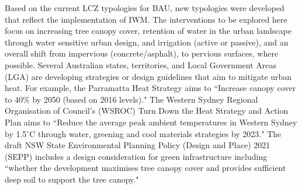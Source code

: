 \documentclass[utf8]{frontiersSCNS} %
\begin{document}

Based on the current LCZ typologies for BAU, new typologies were developed that reflect the implementation of IWM. The interventions to be explored here focus on increasing tree canopy cover, retention of water in the urban landscape through water sensitive urban design, and irrigation (active or passive), and an overall shift from impervious (concrete/asphalt), to pervious surfaces, where possible. Several Australian states, territories, and Local Government Areas (LGA) are developing strategies or design guidelines that aim to mitigate urban heat. For example, the Parramatta Heat Strategy \citep{Paramatta2021} aims to ``Increase canopy cover to 40\% by 2050 (based on 2016 levels)." The Western Sydney Regional Organisation of Council's (WSROC) \citep{WSROC2021} Turn Down the Heat Strategy and Action Plan aims to ``Reduce the average peak ambient temperatures in Western Sydney by 1.5$^{\circ}$C through water, greening and cool materials strategies by 2023." The draft NSW State Environmental Planning Policy (Design and Place) 2021 (SEPP) \citep{NewSouthWales2021} includes a design consideration for green infrastructure including ``whether the development maximises tree canopy cover and provides sufficient deep soil to support the tree canopy."
\end{document}
